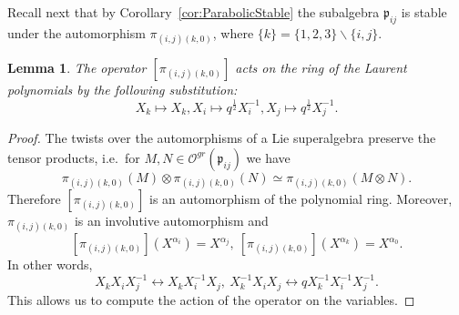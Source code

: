 \documentclass[10pt]{amsart}
\newtheorem{lemma}[theorem]{Lemma}
\newcommand{\fp}{{\mathfrak p}}
\begin{document}
	Recall next that by Corollary~\ref{cor:ParabolicStable}
	the subalgebra $\fp_{ij}$ is stable under the automorphism $\pi_{(i,j)(k,0)}$, where $\{k\}=\{1,2,3\}\backslash \{i,j\}$. 
	\begin{lemma}
		The operator $[\pi_{(i,j)(k,0)}]$ acts on the ring of the Laurent polynomials by the following substitution:
		\[X_k \mapsto X_k, X_i \mapsto q^{\frac{1}{2}}X_i^{-1}, X_j \mapsto q^{\frac{1}{2}}X_j^{-1}.\]
	\end{lemma}
	\begin{proof}
		The twists over the automorphisms of a Lie superalgebra preserve the tensor products, i.e.\ for $M,N \in \mathcal{O}^{gr}(\fp_{ij})$ we have
		\[\pi_{(i,j)(k,0)}(M) \otimes \pi_{(i,j)(k,0)}(N)\simeq \pi_{(i,j)(k,0)}(M\otimes N).\]
		Therefore $[\pi_{(i,j)(k,0)}]$ is an automorphism of the polynomial ring. Moreover, $\pi_{(i,j)(k,0)}$ is an involutive automorphism and
		\[[\pi_{(i,j)(k,0)}](X^{\alpha_i})=X^{\alpha_j},~[\pi_{(i,j)(k,0)}](X^{\alpha_k})=X^{\alpha_0}.\]
		In other words,
		\begin{equation*}
			X_kX_iX_j^{-1} \longleftrightarrow  X_kX_i^{-1}X_j,~  X_k^{-1} X_iX_j\longleftrightarrow  qX_k^{-1} X_i^{-1}X_j^{-1}.
		\end{equation*}
		This allows us to compute the action of the operator on the variables.
	\end{proof}
	
\end{document}
